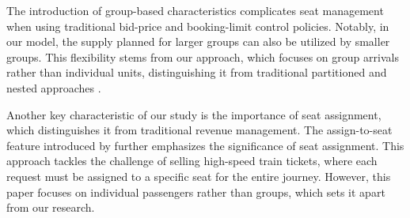 The introduction of group-based characteristics complicates seat management when using traditional bid-price and booking-limit control policies. Notably, in our model, the supply planned for larger groups can also be utilized by smaller groups. This flexibility stems from our approach, which focuses on group arrivals rather than individual units, distinguishing it from traditional partitioned and nested approaches \citep{curry1990optimal, van2008simulation}.

Another key characteristic of our study is the importance of seat assignment, which distinguishes it from traditional revenue management. The assign-to-seat feature introduced by \citet{zhu2023assign} further emphasizes the significance of seat assignment. This approach tackles the challenge of selling high-speed train tickets, where each request must be assigned to a specific seat for the entire journey. However, this paper focuses on individual passengers rather than groups, which sets it apart from our research.

\newpage
